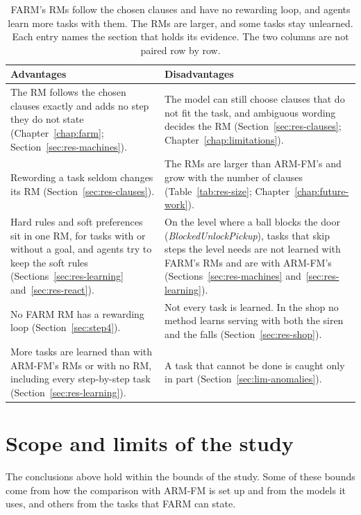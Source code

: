 \documentclass[11pt,english,listoffigures,listoftables]{tfgetsinf}
\newcommand{\env}[1]{\textsf{\slshape #1}}  %
\begin{document}
\begin{table}[H]
\centering
\footnotesize
\renewcommand{\arraystretch}{1.2}
\begin{tabularx}{\textwidth}{@{}>{\raggedright\arraybackslash}X>{\raggedright\arraybackslash}X@{}}
\toprule
\textbf{Advantages} & \textbf{Disadvantages} \\ \midrule
The RM follows the chosen clauses exactly and adds no step they do not state (Chapter~\ref{chap:farm}; Section~\ref{sec:res-machines}). & The model can still choose clauses that do not fit the task, and ambiguous wording decides the RM (Section~\ref{sec:res-clauses}; Chapter~\ref{chap:limitations}). \\ \midrule
Rewording a task seldom changes its RM (Section~\ref{sec:res-clauses}). & The RMs are larger than ARM-FM's and grow with the number of clauses (Table~\ref{tab:res-size}; Chapter~\ref{chap:future-work}). \\ \midrule
Hard rules and soft preferences sit in one RM, for tasks with or without a goal, and agents try to keep the soft rules (Sections~\ref{sec:res-learning} and~\ref{sec:res-react}). & On the level where a ball blocks the door (\env{BlockedUnlockPickup}), tasks that skip steps the level needs are not learned with FARM's RMs and are with ARM-FM's (Sections~\ref{sec:res-machines} and~\ref{sec:res-learning}). \\ \midrule
No FARM RM has a rewarding loop (Section~\ref{sec:step4}). & Not every task is learned. In the shop no method learns serving with both the siren and the falls (Section~\ref{sec:res-shop}). \\ \midrule
More tasks are learned than with ARM-FM's RMs or with no RM, including every step-by-step task (Section~\ref{sec:res-learning}). & A task that cannot be done is caught only in part (Section~\ref{sec:lim-anomalies}). \\ \bottomrule
\end{tabularx}
\caption[Advantages and disadvantages of FARM]{FARM's RMs follow the chosen clauses and have no rewarding loop, and agents learn more tasks with them. The RMs are larger, and some tasks stay unlearned. Each entry names the section that holds its evidence. The two columns are not paired row by row.}
\label{tab:conc-summary}
\end{table}

\section{Scope and limits of the study}
\label{sec:scope}
The conclusions above hold within the bounds of the study. Some of these bounds come from how the comparison with ARM-FM is set up and from the models it uses, and others from the tasks that FARM can state.
\end{document}

